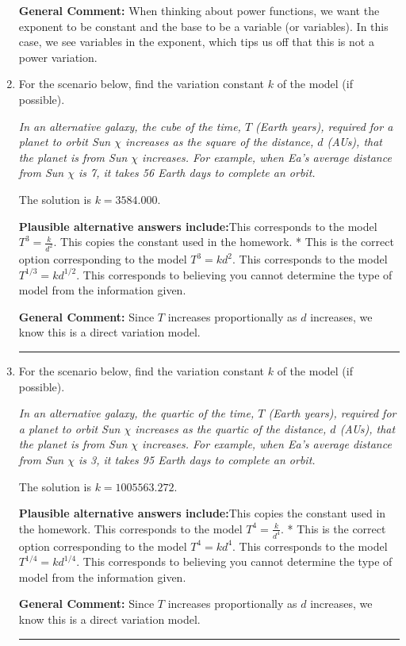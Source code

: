 \documentclass{extbook}[14pt]
\newcommand{\litem}[1]{\item #1

\rule{\textwidth}{0.4pt}}
\begin{document}
\begin{enumerate}
{\begin{enumerate}[label=\Alph*.]
\end{enumerate}

\textbf{General Comment:} When thinking about power functions, we want the exponent to be constant and the base to be a variable (or variables). In this case, we see variables in the exponent, which tips us off that this is not a power variation.
}
\litem{
For the scenario below, find the variation constant $k$ of the model (if possible).

\begin{center}
    \textit{ In an alternative galaxy, the cube of the time, $T$ (Earth years), required for a planet to orbit Sun $\chi$ increases as the square of the distance, $d$ (AUs), that the planet is from Sun $\chi$ increases. For example, when Ea's average distance from Sun $\chi$ is 7, it takes 56 Earth days to complete an orbit. }
\end{center}
The solution is \( k = 3584.000 \).\begin{enumerate}[label=\Alph*.]
\textbf{Plausible alternative answers include:}This corresponds to the model $T^{3} = \frac{k}{d^{2}}$.
This copies the constant used in the homework.
* This is the correct option corresponding to the model $T^{3} = k d^{2}$.
This corresponds to the model $T^{1/3} = k d^{1/2}$.
This corresponds to believing you cannot determine the type of model from the information given.
\end{enumerate}

\textbf{General Comment:} Since $T$ increases proportionally as $d$ increases, we know this is a direct variation model.
}
\litem{
For the scenario below, find the variation constant $k$ of the model (if possible).

\begin{center}
    \textit{ In an alternative galaxy, the quartic of the time, $T$ (Earth years), required for a planet to orbit Sun $\chi$ increases as the quartic of the distance, $d$ (AUs), that the planet is from Sun $\chi$ increases. For example, when Ea's average distance from Sun $\chi$ is 3, it takes 95 Earth days to complete an orbit. }
\end{center}
The solution is \( k = 1005563.272 \).\begin{enumerate}[label=\Alph*.]
\textbf{Plausible alternative answers include:}This copies the constant used in the homework.
This corresponds to the model $T^{4} = \frac{k}{d^{4}}$.
* This is the correct option corresponding to the model $T^{4} = k d^{4}$.
This corresponds to the model $T^{1/4} = k d^{1/4}$.
This corresponds to believing you cannot determine the type of model from the information given.
\end{enumerate}

\textbf{General Comment:} Since $T$ increases proportionally as $d$ increases, we know this is a direct variation model.
}
\end{enumerate}
\end{document}
